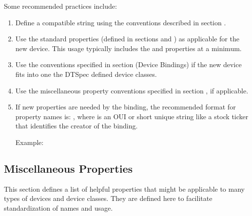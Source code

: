 \documentclass[a4paper,10pt,oneside]{sphinxmanual}
\begin{document}
Some recommended practices include:
\begin{enumerate}
\item {} 
Define a compatible string using the conventions described in section
{\hyperref[devicetree\string-basics:sect\string-standard\string-properties\string-compatible]{}}.

\item {} 
Use the standard properties (defined in sections
{\hyperref[devicetree\string-basics:sect\string-standard\string-properties]{}} and {\hyperref[devicetree\string-basics:sect\string-interrupts]{}}) as
applicable for the new device. This usage typically includes the
 and  properties at a minimum.

\item {} 
Use the conventions specified in section {\hyperref[device\string-bindings:chapter\string-device\string-bindings]{}}
(Device Bindings) if the new device fits into one the DTSpec defined
device classes.

\item {} 
Use the miscellaneous property conventions specified in section
{\hyperref[device\string-bindings:sect\string-misc\string-properties]{}}, if applicable.

\item {} 
If new properties are needed by the binding, the recommended format
for property names is: , where 
is an OUI or short unique string like a stock ticker that identifies
the creator of the binding.

Example: 

\end{enumerate}


\subsection{Miscellaneous Properties}
\label{device-bindings:sect-misc-properties}\label{device-bindings:miscellaneous-properties}
This section defines a list of helpful properties that might be
applicable to many types of devices and device classes. They are defined
here to facilitate standardization of names and usage.
\end{document}
